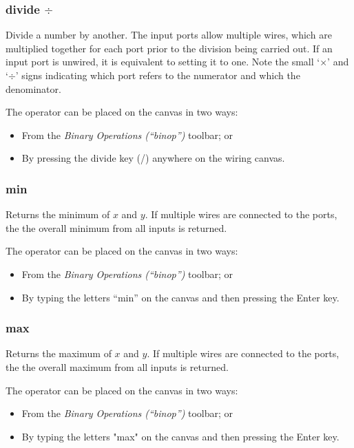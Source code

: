 \subsubsection{divide $\div$}


\label{Operation:divide} Divide a number by another. The input ports
allow multiple wires, which are multiplied together for each port
prior to the division being carried out. If an input port is unwired,
it is equivalent to setting it to one. Note the small `$\times$'
and `$\div$' signs indicating which port refers to the numerator
and which the denominator.

The operator can be placed on the canvas in two ways:
\begin{itemize}
\item From the \emph{Binary Operations (``binop'')} toolbar; or 
\item By pressing the divide key (/) anywhere on the wiring canvas. 
\end{itemize}

\subsubsection{min}


\label{Operation:min} Returns the minimum of $x$ and $y$. If multiple
wires are connected to the ports, the the overall minimum from all
inputs is returned.

The operator can be placed on the canvas in two ways:
\begin{itemize}
\item From the \emph{Binary Operations (``binop'')} toolbar; or 
\item By typing the letters ``min'' on the canvas and then pressing the
Enter key. 
\end{itemize}

\subsubsection{max}


\label{Operation:max} Returns the maximum of $x$ and $y$. If multiple
wires are connected to the ports, the the overall maximum from all
inputs is returned.

The operator can be placed on the canvas in two ways:
\begin{itemize}
\item From the \emph{Binary Operations (``binop'') }toolbar; or 
\item By typing the letters "max" on the canvas and then pressing the
Enter key. 
\end{itemize}

